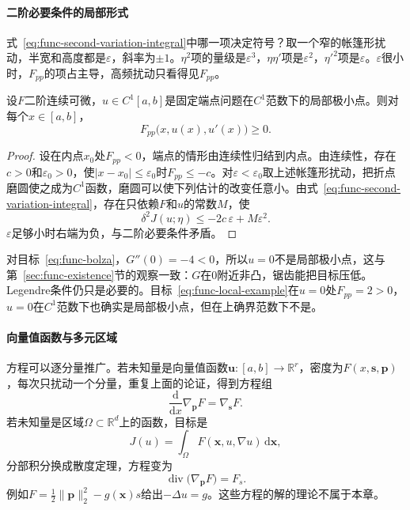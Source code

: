 \paragraph{二阶必要条件的局部形式}
式~\eqref{eq:func-second-variation-integral}中哪一项决定符号？取一个窄的帐篷形扰动，半宽和高度都是$\varepsilon$，斜率为$\pm1$。$\eta^2$项的量级是$\varepsilon^3$，$\eta\eta'$项是$\varepsilon^2$，$\eta'^2$项是$\varepsilon$。$\varepsilon$很小时，$F_{pp}$的项占主导，高频扰动只看得见$F_{pp}$。

\begin{theorem}[Legendre条件]
\label{thm:func-legendre}
设$F$二阶连续可微，$u\in C^1[a,b]$是固定端点问题在$C^1$范数下的局部极小点。则对每个$x\in[a,b]$，
\begin{equation}
 F_{pp}\bigl(x,u(x),u'(x)\bigr)\geq0.
 \label{eq:func-legendre}
\end{equation}
\end{theorem}

\begin{proof}
设在内点$x_0$处$F_{pp}<0$，端点的情形由连续性归结到内点。由连续性，存在$c>0$和$\varepsilon_0>0$，使$\lvert x-x_0\rvert\leq\varepsilon_0$时$F_{pp}\leq-c$。对$\varepsilon<\varepsilon_0$取上述帐篷形扰动，把折点磨圆使之成为$C^1$函数，磨圆可以使下列估计的改变任意小。由式~\eqref{eq:func-second-variation-integral}，存在只依赖$F$和$u$的常数$M$，使
\[
 \delta^2J(u;\eta)\leq-2c\,\varepsilon+M\varepsilon^2.
\]
$\varepsilon$足够小时右端为负，与二阶必要条件矛盾。
\end{proof}

对目标~\eqref{eq:func-bolza}，$G''(0)=-4<0$，所以$u=0$不是局部极小点，这与第~\ref{sec:func-existence}节的观察一致：$G$在$0$附近非凸，锯齿能把目标压低。Legendre条件仍只是必要的。目标~\eqref{eq:func-local-example}在$u=0$处$F_{pp}=2>0$，$u=0$在$C^1$范数下也确实是局部极小点，但在上确界范数下不是。

\paragraph{向量值函数与多元区域}
方程可以逐分量推广。若未知量是向量值函数$\bm{u}:[a,b]\to\mathbb{R}^r$，密度为$F(x,\bm{s},\bm{p})$，每次只扰动一个分量，重复上面的论证，得到方程组
\begin{equation}
 \frac{\mathrm{d}}{\mathrm{d}x}\nabla_{\bm{p}}F=\nabla_{\bm{s}}F.
 \label{eq:func-euler-lagrange-vector}
\end{equation}
若未知量是区域$\Omega\subset\mathbb{R}^d$上的函数，目标是
\[
 J(u)=\int_\Omega F(\bm{x},u,\nabla u)\,\mathrm{d}\bm{x},
\]
分部积分换成散度定理，方程变为
\begin{equation}
 \operatorname{div}\bigl(\nabla_{\bm{p}}F\bigr)=F_s.
 \label{eq:func-euler-lagrange-div}
\end{equation}
例如$F=\frac12\lVert\bm{p}\rVert_2^2-g(\bm{x})s$给出$-\Delta u=g$。这些方程的解的理论不属于本章。

